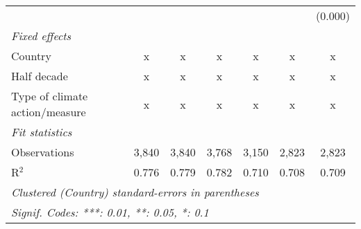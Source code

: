 \begin{tabular}{lcccccc}
                                                    &               &              &              &                &                & (0.000)\\   
   \emph{Fixed effects}\\
   Country                                          & x             & x            & x            & x              & x              & x\\  
   Half decade                                      & x             & x            & x            & x              & x              & x\\  
   Type of climate action/measure                   & x             & x            & x            & x              & x              & x\\  
   \midrule \emph{Fit statistics}\\
   Observations                                     & 3,840         & 3,840        & 3,768        & 3,150          & 2,823          & 2,823\\  
   R$^2$                                            & 0.776         & 0.779        & 0.782        & 0.710          & 0.708          & 0.709\\  
   \midrule
   \multicolumn{7}{l}{\emph{Clustered (Country) standard-errors in parentheses}}\\
   \multicolumn{7}{l}{\emph{Signif. Codes: ***: 0.01, **: 0.05, *: 0.1}}\\
\end{tabular}
\par\endgroup


